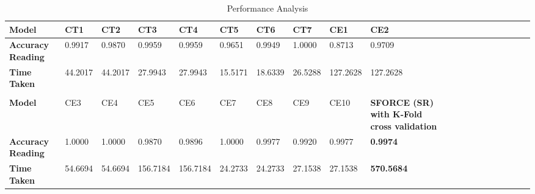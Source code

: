 \documentclass[final,1p,times,twocolumn]{elsarticle}
\begin{document}
\begin{table}[!t]
\scriptsize
\caption{Performance Analysis}
\label{table:t1}
\centering
{
\begin{tabular}{| l | l | l | l | l | l | l | l | l | l | l | l | l | l | l | l | l | l | l | l |}
\hline
\textbf{Model} & {CT1} & {CT2} & {CT3} & {CT4} & {CT5} & {CT6} & {CT7} & {CE1} & {CE2}\\
\hline
\textbf{Accuracy Reading}& 0.9917 & 0.9870 & 0.9959 & 0.9959 & 0.9651 & 0.9949 & 1.0000 & 0.8713 & 0.9709\\
\hline
\textbf{Time Taken}& 44.2017 & 44.2017 & 27.9943 & 27.9943 & 15.5171 & 18.6339 & 26.5288 & 127.2628 & 127.2628\\
\hline
&&&&&&&&&\\
\hline
\textbf{Model} & {CE3} & {CE4} & {CE5} & {CE6} & {CE7} & {CE8} & {CE9} & {CE10} & \textbf{SFORCE (SR) with K-Fold cross validation} \\
\hline
\textbf{Accuracy Reading}& 1.0000 & 1.0000 & 0.9870 & 0.9896 & 1.0000 & 0.9977 & 0.9920 & 0.9977 & \textbf{0.9974} \\
\hline
\textbf{Time Taken}& 54.6694 & 54.6694 & 156.7184 & 156.7184 & 24.2733 & 24.2733 & 27.1538 & 27.1538 & \textbf{570.5684} \\
\hline
\end{tabular}
}
\end{table}
% 
\end{document}
